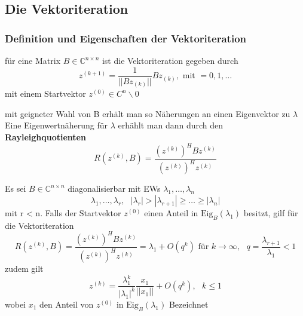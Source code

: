 \documentclass[
	ngerman,
	accentcolor=9c,%
	type=intern,
	marginpar=false
	]{tudapub}
\begin{document}
        \subsection{Die Vektoriteration}
            \subsubsection{Definition und Eigenschaften der Vektoriteration}
                \begin{definition}
                    für eine Matrix $B \in \mathbb{C}^{n \times n}$ ist die Vektoriteration gegeben durch
                    \begin{equation*}
                        z^{(k+1)} = \dfrac{1}{||Bz_{(k)}||}Bz_{(k)}, \mbox{ mit }= 0,1, \dots
                    \end{equation*}
                    mit einem Startvektor $z^{(0)} \in C^n \backslash {0}$
                \end{definition}
                mit geigneter Wahl von B erhält man so Näherungen an einen Eigenvektor zu $\lambda$
                Eine Eigenwertnäherung für $\lambda$ erhählt man dann durch den \textbf{Rayleighquotienten}
                \begin{equation*}
                    R(z^{(k)},B)=\dfrac{(z^{(k)})^HBz^{(k)}}{(z^{(k)})^Hz^{(k)}}
                \end{equation*}
                \begin{satz}
                    Es sei $B \in \mathbb{C}^{n \times n}$ diagonalisierbar mit EWs $\lambda_1,\dots,\lambda_n$
                    \begin{equation}
                        \lambda_1,\dots,\lambda_r, \mbox{ }|\lambda_r| > |\lambda_{r+1}| \geq \dots \geq|\lambda_n|
                    \end{equation}
                    mit r < n. Falls der Startvektor $z^{(0)}$ einen Anteil in $\text{Eig}_B(\lambda_1)$ besitzt, gilf für die Vektoriteration
                    \begin{equation*}
                        R(z^{(k)},B)=\dfrac{(z^{(k)})^HBz^{(k)}}{(z^{(k)})^Hz^{(k)}} = \lambda_1 + O(q^k) \text{ für } k \rightarrow \infty, \mbox{ } q=\dfrac{\lambda_{r+1}}{\lambda_1} < 1
                    \end{equation*}
                    zudem gilt
                    \begin{equation*}
                        z^{(k)} = \dfrac{\lambda_1^k}{|\lambda_1|^k}\dfrac{x_1}{||x_1||} + O(q^k), \mbox{ } k \leq 1
                    \end{equation*}
                    wobei $x_1$ den Anteil von $z^{(0)}$ in $\text{Eig}_B(\lambda_1)$ Bezeichnet
                \end{satz}
                \newpage
\end{document}
